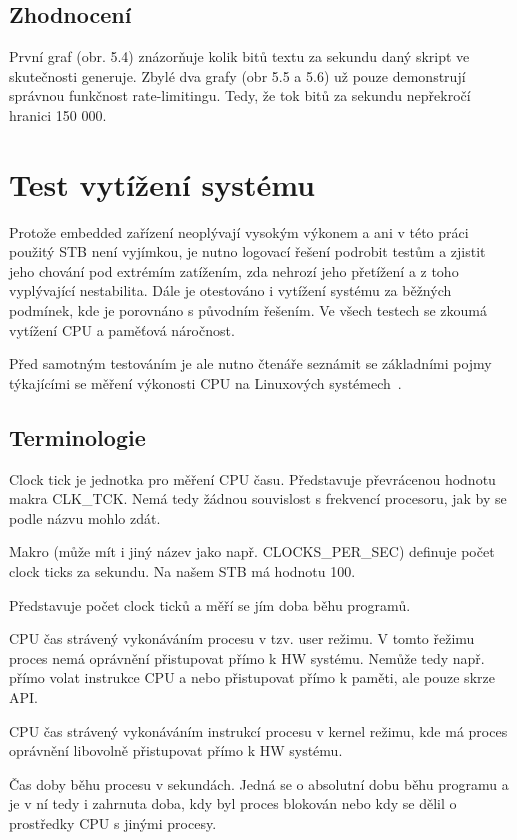 \documentclass[thesis=B,czech]{FITthesis}[2012/06/26]
\begin{document}
\subsection{Zhodnocení}
První graf (obr. 5.4) znázorňuje kolik bitů textu za sekundu daný skript ve skutečnosti generuje.
Zbylé dva grafy (obr 5.5 a 5.6) už pouze demonstrují správnou funkčnost rate-limitingu. Tedy, že tok bitů za sekundu nepřekročí hranici 150 000.

\section{Test vytížení systému}
Protože embedded zařízení neoplývají vysokým výkonem a ani v této práci použitý STB není vyjímkou, je nutno logovací řešení podrobit testům a zjistit jeho chování pod extrémím zatížením, zda nehrozí jeho přetížení a z toho vyplývající nestabilita. Dále je otestováno i vytížení systému za běžných podmínek, kde je porovnáno s původním řešením. Ve všech testech se zkoumá vytížení CPU a paměťová náročnost.

Před samotným testováním je ale nutno čtenáře seznámit se základními pojmy týkajícími se měření výkonosti CPU na Linuxových systémech~\cite{MeasuringPerformance}.

\subsection{Terminologie}

\begin{description}
\setlength\itemsep{-1ex}
	\item [Clock tick:] Clock tick je jednotka pro měření CPU času. Představuje převrácenou hodnotu makra CLK\_TCK. Nemá tedy žádnou souvislost s frekvencí procesoru, jak by se podle názvu mohlo zdát.
	\item [CLK\_TCK:] Makro (může mít i jiný název jako např. CLOCKS\_PER\_SEC) definuje počet clock ticks za sekundu. Na našem STB má hodnotu 100.
	\item [CPU čas:] Představuje počet clock ticků a měří se jím doba běhu programů.
	\item [User time:] CPU čas strávený vykonáváním procesu v tzv. user režimu. V tomto řežimu proces nemá oprávnění přistupovat přímo k HW systému. Nemůže tedy např. přímo volat instrukce CPU a nebo přistupovat přímo k paměti, ale pouze skrze API.
	\item [Sys time:] CPU čas strávený vykonáváním instrukcí procesu v kernel režimu, kde má proces oprávnění libovolně přistupovat přímo k HW systému.
	\item [Real time:] Čas doby běhu procesu v sekundách. Jedná se o absolutní dobu běhu programu a je v ní tedy i zahrnuta doba, kdy byl proces blokován nebo kdy se dělil o prostředky CPU s jinými procesy.
	\end{description}
\end{document}
